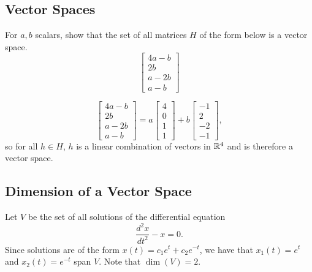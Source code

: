\subsection{Vector Spaces}
\begin{prob}
    For $a,b$ scalars, show that the set of all matrices $H$ of the form below is a vector space. \[
    \begin{bmatrix}
       4a-b\\
       2b\\
       a-2b\\
       a-b
    \end{bmatrix}
    \] 
\end{prob}
\begin{solution}
    \[
    \begin{bmatrix}
       4a-b\\
       2b\\
       a-2b\\
       a-b
    \end{bmatrix}=
    a
    \begin{bmatrix}
        4\\
        0\\
        1\\
        1
    \end{bmatrix}+b
    \begin{bmatrix}
        -1\\
        2\\
        -2\\
        -1
    \end{bmatrix},
\] so for all $h\in H$, $h$ is a linear combination of vectors in $\mathbb{R}^4$ and is therefore a vector space.
\end{solution}

\subsection{Dimension of a Vector Space}
\begin{example}
    Let $V$ be the set of all solutions of the differential equation \[
    \frac{d^2x}{dt^2}-x=0.
\] Since solutions are of the form $x(t)=c_1e^t+c_2e^{-t}$, we have that $x_1(t)=e^t$ and $x_2(t)=e^{-t}$ span $V$. Note that $\operatorname{dim}(V)=2$.
\end{example}


